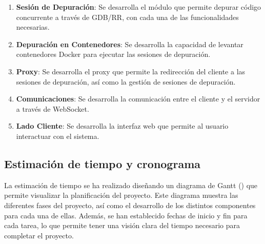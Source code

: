 \begin{enumerate}
    \item \textbf{Sesión de Depuración}: Se desarrolla el módulo que permite depurar código concurrente a través de GDB/RR, con cada una de las funcionalidades necesarias. 
    \item \textbf{Depuración en Contenedores}: Se desarrolla la capacidad de levantar contenedores Docker para ejecutar las sesiones de depuración.
    \item \textbf{Proxy}: Se desarrolla el proxy que permite la redirección del cliente a las sesiones de depuración, así como la gestión de sesiones de depuración.
    \item \textbf{Comunicaciones}: Se desarrolla la comunicación entre el cliente y el servidor a través de WebSocket.
    \item \textbf{Lado Cliente}: Se desarrolla la interfaz web que permite al usuario interactuar con el sistema.
\end{enumerate} 

\subsection{Estimación de tiempo y cronograma}\label{sec:cronograma}
La estimación de tiempo se ha realizado diseñando un diagrama de Gantt () que permite visualizar la planificación del proyecto. Este diagrama muestra las diferentes fases del proyecto, así como el desarrollo de los distintos componentes para cada una de ellas. Además, se han establecido fechas de inicio y fin para cada tarea, lo que permite tener una visión clara del tiempo necesario para completar el proyecto.

